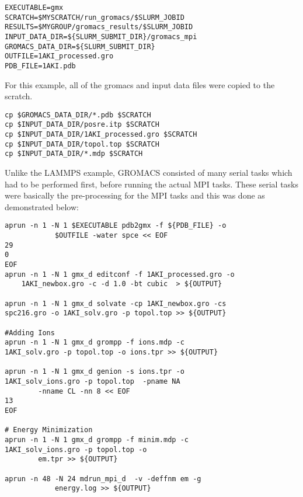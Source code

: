 \begin{tcolorbox}
\begin{Verbatim}[fontsize=\scriptsize]
EXECUTABLE=gmx 
SCRATCH=$MYSCRATCH/run_gromacs/$SLURM_JOBID
RESULTS=$MYGROUP/gromacs_results/$SLURM_JOBID
INPUT_DATA_DIR=${SLURM_SUBMIT_DIR}/gromacs_mpi
GROMACS_DATA_DIR=${SLURM_SUBMIT_DIR}
OUTFILE=1AKI_processed.gro
PDB_FILE=1AKI.pdb
\end{Verbatim}
\end{tcolorbox}

For this example, all of the gromacs and input data files were copied to the scratch.

\begin{tcolorbox}
\begin{Verbatim}[fontsize=\scriptsize] 
cp $GROMACS_DATA_DIR/*.pdb $SCRATCH
cp $INPUT_DATA_DIR/posre.itp $SCRATCH
cp $INPUT_DATA_DIR/1AKI_processed.gro $SCRATCH
cp $INPUT_DATA_DIR/topol.top $SCRATCH
cp $INPUT_DATA_DIR/*.mdp $SCRATCH
\end{Verbatim}
\end{tcolorbox}

Unlike the LAMMPS example, GROMACS consisted of many serial tasks which had to be performed first, before running the actual MPI tasks. These serial 
tasks were basically the pre-processing for the MPI tasks and this was done as demonstrated below:
  
\begin{tcolorbox}
\begin{Verbatim}[fontsize=\scriptsize] 
aprun -n 1 -N 1 $EXECUTABLE pdb2gmx -f ${PDB_FILE} -o 
			$OUTFILE -water spce << EOF
29
0
EOF
aprun -n 1 -N 1 gmx_d editconf -f 1AKI_processed.gro -o 
	1AKI_newbox.gro -c -d 1.0 -bt cubic  > ${OUTPUT}

aprun -n 1 -N 1 gmx_d solvate -cp 1AKI_newbox.gro -cs 
spc216.gro -o 1AKI_solv.gro -p topol.top >> ${OUTPUT}

#Adding Ions
aprun -n 1 -N 1 gmx_d grompp -f ions.mdp -c 
1AKI_solv.gro -p topol.top -o ions.tpr >> ${OUTPUT}

aprun -n 1 -N 1 gmx_d genion -s ions.tpr -o 
1AKI_solv_ions.gro -p topol.top  -pname NA 
		-nname CL -nn 8 << EOF 
13
EOF

# Energy Minimization
aprun -n 1 -N 1 gmx_d grompp -f minim.mdp -c 
1AKI_solv_ions.gro -p topol.top -o 
		em.tpr >> ${OUTPUT}

aprun -n 48 -N 24 mdrun_mpi_d  -v -deffnm em -g 
			energy.log >> ${OUTPUT}
\end{Verbatim}
\end{tcolorbox}

